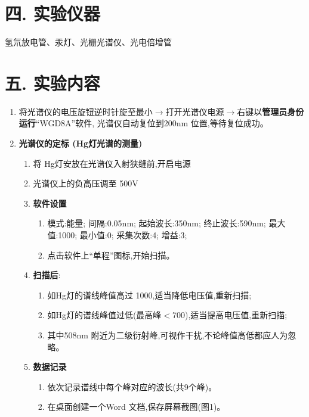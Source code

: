 \documentclass[12pt,a4paper]{article}
\begin{document}
	\section*{\textbf{{四. 实验仪器}}}
	氢氘放电管、汞灯、光栅光谱仪、光电倍增管

	\section*{\textbf{{五. 实验内容}}}

	\begin{enumerate}
		\item 将光谱仪的电压旋钮逆时针旋至最小$\longrightarrow$打开光谱仪电源$\longrightarrow$右键以\textbf{管理员身份运行}“WGD8A”软件, 光谱仪自动复位到200nm 位置,等待复位成功。

		\item \textbf{光谱仪的定标 (Hg灯光谱的测量)}
		\begin{enumerate}
			\item 将 Hg灯安放在光谱仪入射狭缝前,开启电源
			\item 光谱仪上的负高压调至 500V
			\item \textbf{软件设置}
			\begin{enumerate}
				\item 模式:能量; 间隔:0.05nm; 起始波长:350nm; 终止波长:590nm; 最大值:1000; 最小值:0; 采集次数:4; 增益:3;
				\item 点击软件上“单程”图标,开始扫描。
			\end{enumerate}
			\item \textbf{扫描后}:
			\begin{enumerate}
				\item 如Hg灯的谱线峰值高过 1000,适当降低电压值,重新扫描;
				\item 如Hg灯的谱线峰值过低(最高峰$<$700),适当提高电压值,重新扫描;
				\item 其中508nm 附近为二级衍射峰,可视作干扰,不论峰值高低都应人为忽略。
			\end{enumerate}
			\item \textbf{数据记录}
			\begin{enumerate}
				\item 依次记录谱线中每个峰对应的波长(共9个峰)。
				\item 在桌面创建一个Word 文档,保存屏幕截图(图1)。
			\end{enumerate}
		\end{enumerate}


\end{enumerate}
\end{document}
